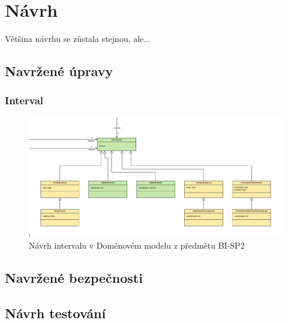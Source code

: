 \chapter{Návrh}
Většina návrhu se zůstala stejnou, ale...
\section{Navržené úpravy}
    \subsection{Interval}
    \begin{figure}\centering
	    \includegraphics[width=1.0\textwidth]{pdfs/Interval1}
	    \caption[Návrh intervalu]{Návrh intervalu v Doménovém modelu z předmětu BI-SP2}\label{image:Interval1}
    \end{figure}
\section{Navržené bezpečnosti}
\section{Návrh testování}